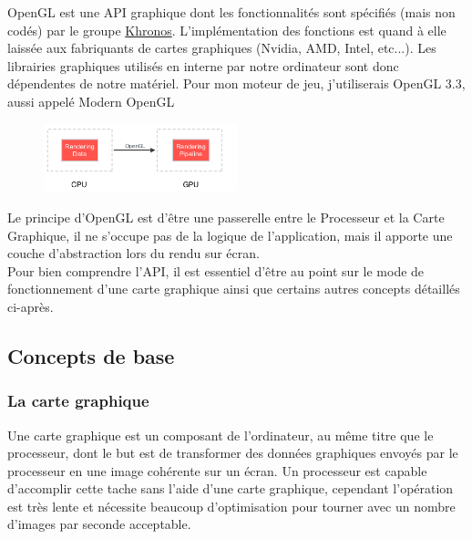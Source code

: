 \documentclass[a4paper,10pt]{report}
\begin{document}
OpenGL est une API graphique dont les fonctionnalités sont spécifiés (mais non codés) par le groupe \href{https://www.khronos.org/}{Khronos}. L'implémentation des fonctions est quand à elle laissée aux fabriquants de cartes graphiques (Nvidia, AMD, Intel, etc...). Les librairies graphiques utilisés en interne par notre ordinateur sont donc dépendentes de notre matériel.
Pour mon moteur de jeu, j'utiliserais OpenGL 3.3, aussi appelé Modern OpenGL
\\
\begin{figure}
    \centering
    \includegraphics[width=0.5\textwidth]{OpenGL_purpose}
\end{figure}

Le principe d'OpenGL est d'être une passerelle entre le Processeur et la Carte Graphique, il ne s'occupe pas de la logique de l'application, mais il apporte une couche d'abstraction lors du rendu sur écran.
\\
Pour bien comprendre l'API, il est essentiel d'être au point sur le mode de fonctionnement d'une carte graphique ainsi que certains autres concepts détaillés ci-après.

\subsection{Concepts de base}
\subsubsection{La carte graphique}
Une carte graphique est un composant de l'ordinateur, au même titre que le processeur, dont le but est de transformer des données graphiques envoyés par le processeur en une image cohérente sur un écran. Un processeur est capable d'accomplir cette tache sans l'aide d'une carte graphique, cependant l'opération est très lente et nécessite beaucoup d'optimisation pour tourner avec un nombre d'images par seconde acceptable.
\end{document}
